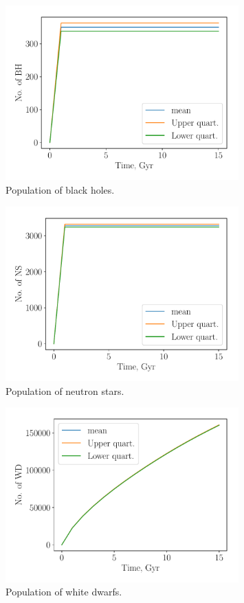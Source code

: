 \documentclass{article}
\begin{document}
\begin{figure}
\centering
\includegraphics[width=0.8\textwidth]{bh.pdf}
\caption{Population of black holes.}
\label{bh}
\end{figure}

\begin{figure}
\centering
\includegraphics[width=0.8\textwidth]{ns.pdf}
\caption{Population of neutron stars.}
\label{ns}
\end{figure}

\begin{figure}
\centering
\includegraphics[width=0.8\textwidth]{wd.pdf}
\caption{Population of white dwarfs.}
\label{wd}
\end{figure}
\end{document}

